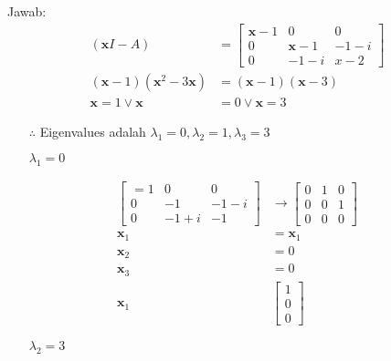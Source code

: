 \documentclass[12pt, a4paper]{scrartcl}
\begin{document}
\begin{enumerate}
\begin{enumerate}
                Jawab:
                \begin{align*}
                    (\textbf{x}I-A) &= \begin{bmatrix}
                        \textbf{x}-1&0&0\\0&\textbf{x}-1&-1-i\\0&-1-i&x-2
                    \end{bmatrix}
                    \\ (\textbf{x}-1)(\textbf{x}^2-3\textbf{x})&=(\textbf{x}-1)(\textbf{x}-3)
                    \\ \textbf{x}=1\lor \textbf{x}&=0 \lor \textbf{x}=3
                \end{align*}
                \begin{itemize}
                    \item[$\therefore$] Eigenvalues adalah $\lambda_1=0, \lambda_2=1,\lambda_3=3$
                    \pagebreak
                    \item[] $\lambda_1 = 0$
                \end{itemize}
                \begin{align*}
                    \begin{bmatrix}
                        =1&0&0\\0&-1&-1-i\\0&-1+i&-1
                    \end{bmatrix}&\to\begin{bmatrix}
                        0&1&0\\0&0&1\\0&0&0
                    \end{bmatrix}
                    \\\textbf{x}_1&=\textbf{x}_1
                    \\\textbf{x}_2&=0
                    \\\textbf{x}_3&=0
                    \\\textbf{x}_1&\begin{bmatrix}
                        1\\0\\0
                    \end{bmatrix}
                \end{align*}
                \begin{itemize}
                    \item[] $\lambda_2=3$
                \end{itemize}
                \begin{align*}

\end{align*}
\end{enumerate}
\end{enumerate}
\end{document}
